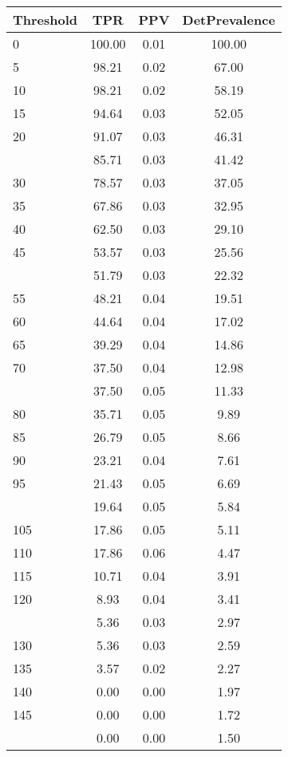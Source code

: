 \begin{table}[ht]
\centering
\begin{tabular}{lccc}
  \toprule
Threshold & TPR & PPV & DetPrevalence \\ 
  \midrule
0 & 100.00 & 0.01 & 100.00 \\ 
  5 & 98.21 & 0.02 & 67.00 \\ 
  10 & 98.21 & 0.02 & 58.19 \\ 
  15 & 94.64 & 0.03 & 52.05 \\ 
  20 & 91.07 & 0.03 & 46.31 \\ 
   \addlinespace
25 & 85.71 & 0.03 & 41.42 \\ 
  30 & 78.57 & 0.03 & 37.05 \\ 
  35 & 67.86 & 0.03 & 32.95 \\ 
  40 & 62.50 & 0.03 & 29.10 \\ 
  45 & 53.57 & 0.03 & 25.56 \\ 
   \addlinespace
50 & 51.79 & 0.03 & 22.32 \\ 
  55 & 48.21 & 0.04 & 19.51 \\ 
  60 & 44.64 & 0.04 & 17.02 \\ 
  65 & 39.29 & 0.04 & 14.86 \\ 
  70 & 37.50 & 0.04 & 12.98 \\ 
   \addlinespace
75 & 37.50 & 0.05 & 11.33 \\ 
  80 & 35.71 & 0.05 & 9.89 \\ 
  85 & 26.79 & 0.05 & 8.66 \\ 
  90 & 23.21 & 0.04 & 7.61 \\ 
  95 & 21.43 & 0.05 & 6.69 \\ 
   \addlinespace
100 & 19.64 & 0.05 & 5.84 \\ 
  105 & 17.86 & 0.05 & 5.11 \\ 
  110 & 17.86 & 0.06 & 4.47 \\ 
  115 & 10.71 & 0.04 & 3.91 \\ 
  120 & 8.93 & 0.04 & 3.41 \\ 
   \addlinespace
125 & 5.36 & 0.03 & 2.97 \\ 
  130 & 5.36 & 0.03 & 2.59 \\ 
  135 & 3.57 & 0.02 & 2.27 \\ 
  140 & 0.00 & 0.00 & 1.97 \\ 
  145 & 0.00 & 0.00 & 1.72 \\ 
   \addlinespace
150 & 0.00 & 0.00 & 1.50 \\ 

\end{tabular}
\end{table}
